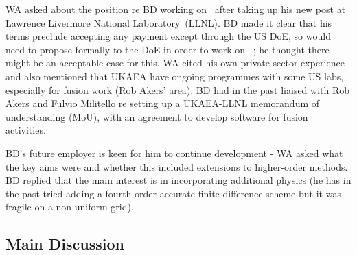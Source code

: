 WA asked about the position re BD working on \nep \   after taking up his new 
post at Lawrence Livermore National Laboratory~(LLNL).  BD made it clear 
that his terms preclude accepting any payment except through the US DoE, so 
would need to propose formally to the DoE in order to work on \nep \  ; he 
thought there might be an acceptable case for this.  WA cited his own private 
sector experience and also mentioned that UKAEA have ongoing programmes with 
some US labs, especially for fusion work (Rob Akers' area).  BD had in the past 
liaised with Rob Akers and Fulvio Militello re setting up a UKAEA-LLNL
memorandum of understanding (MoU), with an agreement to develop software for fusion activities.

BD's future employer is keen for him to continue 
development - WA asked what the key aims were and whether this included 
extensions to higher-order methods.  BD replied that the main interest is in 
incorporating additional physics (he has in the past tried adding a 
fourth-order accurate finite-difference scheme but it was fragile on a 
non-uniform grid).

\subsection{Main Discussion}\label{sec:maindisc}

